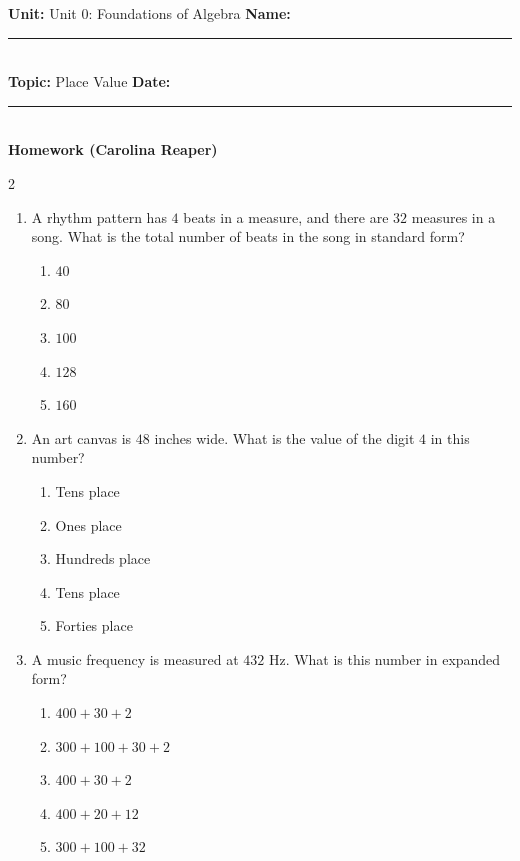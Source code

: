 \documentclass[10pt]{article}
\begin{document}
\enlargethispage{2.5cm}

\begin{tcolorbox}[colback=mainblue!5, colframe=mainblue, sharp corners, boxrule=0.5pt]
    \small \textbf{Unit:} Unit 0: Foundations of Algebra \hfill \textbf{Name:} \rule{3cm}{0.4pt} \\
    \small \textbf{Topic:} Place Value \hfill \textbf{Date:} \rule{2cm}{0.4pt} \\
    \centering \textbf{\large Homework (Carolina Reaper)}
\end{tcolorbox}

\vspace{0.2cm}

\begin{multicols}{2}
\begin{enumerate}[label=\textbf{Q\arabic*.}, leftmargin=*, itemsep=6pt, parsep=0pt]

  \item \small A rhythm pattern has $4$ beats in a measure, and there are $32$ measures in a song. What is the total number of beats in the song in standard form?
  \begin{enumerate}[label=(\Alph*), leftmargin=0.6cm, nosep, itemsep=2pt]
    \item $40$
    \item $80$
    \item $100$
    \item $128$
    \item $160$
  \end{enumerate}

  \item \small An art canvas is $48$ inches wide. What is the value of the digit $4$ in this number?
  \begin{enumerate}[label=(\Alph*), leftmargin=0.6cm, nosep, itemsep=2pt]
    \item Tens place
    \item Ones place
    \item Hundreds place
    \item Tens place
    \item Forties place
  \end{enumerate}

  \item \small A music frequency is measured at $432$ Hz. What is this number in expanded form?
  \begin{enumerate}[label=(\Alph*), leftmargin=0.6cm, nosep, itemsep=2pt]
    \item $400 + 30 + 2$
    \item $300 + 100 + 30 + 2$
    \item $400 + 30 + 2$
    \item $400 + 20 + 12$
    \item $300 + 100 + 32$
  \end{enumerate}


\end{enumerate}
\end{multicols}
\end{document}
